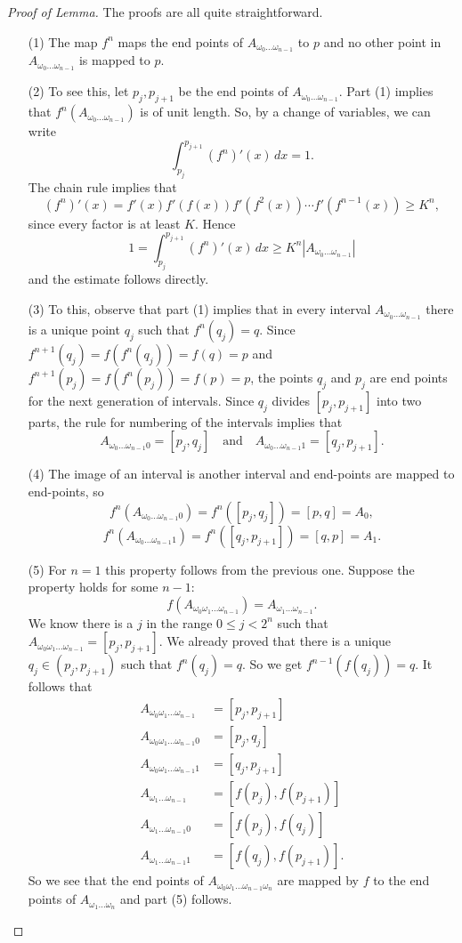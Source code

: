 \documentclass[12pt]{article}
\theoremstyle{definition}
\theoremstyle{remark}
\begin{document}
\begin{proof}[Proof of Lemma]
The proofs are all quite straightforward.
\begin{enumerate}
\item[(1)]
The map $f^n$ maps the end points of $A_{\omega_0 \ldots \omega_{n-1}}$ to $p$ and no other
point in  $A_{\omega_0 \ldots \omega_{n-1}}$ is mapped to $p$.
\item[(2)]
To see this, let $p_j,p_{j+1}$ be the end points of $A_{\omega_0 \ldots \omega_{n-1}}$. 
Part (1) implies that $f^n(A_{\omega_0 \ldots \omega_{n-1}})$
is of unit length. So, by a change of variables, we can write
\[
\int_{p_j}^{p_{j+1}} (f^n)'(x) \, dx = 1.
\]
The chain rule implies that
\[
(f^n)'(x) = f'(x) f'(f(x)) f'(f^2(x)) \cdots f'(f^{n-1}(x)) \ge K^n,
\]
since every factor is at least $K$. Hence
\[
1 = \int_{p_j}^{p_{j+1}} (f^n)'(x) \, dx \ge K^n |A_{\omega_0 \ldots \omega_{n-1}}|
\]
and the estimate follows directly.
\item[(3)]
To this, observe that part (1) implies that in every interval $A_{\omega_0 \ldots \omega_{n-1}}$ 
there is a unique
point $q_j$ such that $f^n(q_j) = q$. Since $f^{n+1}(q_j) = f(f^n(q_j)) = f(q) = p$ and $f^{n+1}(p_j) =
f(f^n(p_j)) = f(p) = p$, the points $q_j$ and $p_j$ are end points for the next generation of
intervals. Since $q_j$ divides $[p_j,p_{j+1}]$ into two parts, the rule for numbering of the intervals
implies that
\[
A_{\omega_0 \ldots \omega_{n-1} 0} = [p_j,q_j] \quad
\text{and} \quad A_{\omega_0 \ldots \omega_{n-1}1} = [q_j,p_{j+1}].
\]
\item[(4)]
The image of an interval is another interval and end-points are mapped to end-points, so
\[
f^n(A_{\omega_0 \ldots \omega_{n-1} 0}) = f^n([p_j,q_j]) = [p,q] = A_0,
\]
\[
f^n(A_{\omega_0 \ldots \omega_{n-1} 1}) = f^n([q_j,p_{j+1}]) = [q,p] = A_1.
\]
\item[(5)]
For $n = 1$ this property follows from the previous one. Suppose the property holds for
some $n-1$:
\[
f(A_{\omega_0 \omega_1 \ldots \omega_{n-1}}) = A_{\omega_1 \ldots \omega_{n-1}}.
\]
We know there is a $j$ in the range $0 \le j <2^n$ such that
$A_{\omega_0 \omega_1 \ldots \omega_{n-1}} = [p_j,p_{j+1}]$. We already proved that there 
is a unique $q_j \in (p_j,p_{j+1})$ such that
$f^n(q_j)=q$. So we get 
$f^{n-1}(f(q_j))=q$. It follows that
\begin{align*}
A_{\omega_0 \omega_1 \ldots \omega_{n-1}} &= [p_j,p_{j+1}] \\
A_{\omega_0 \omega_1 \ldots \omega_{n-1} 0} &= [p_j,q_j] \\
A_{\omega_0 \omega_1 \ldots \omega_{n-1} 1} &= [q_j,p_{j+1}] \\
A_{\omega_1 \ldots \omega_{n-1}} &= [f(p_j),f(p_{j+1})] \\
A_{\omega_1 \ldots \omega_{n-1} 0} &= [f(p_j),f(q_j)] \\
A_{\omega_1 \ldots \omega_{n-1} 1} &= [f(q_j),f(p_{j+1})].
\end{align*}
So we see that the end points of $A_{\omega_0 \omega_1 \ldots \omega_{n-1} \omega_n}$ are
mapped by $f$ to the end points of $A_{\omega_1 \ldots \omega_n}$ and part (5) follows.
\end{enumerate}
\end{proof}
\end{document}
